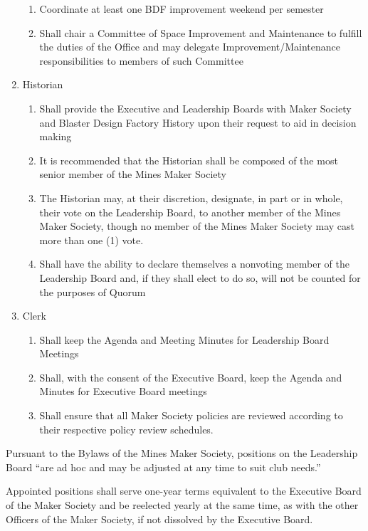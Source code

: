\documentclass[12pt,letterpaper]{article}
\begin{document}
\begin{enumerate}
\begin{enumerate}
        \item Coordinate at least one BDF improvement weekend per semester
        \item Shall chair a Committee of Space Improvement and Maintenance to fulfill the duties of the Office and may delegate Improvement/Maintenance responsibilities to members of such Committee
    \end{enumerate}
    \item Historian 
    \begin{enumerate}
        \item Shall provide the Executive and Leadership Boards with Maker Society and Blaster Design Factory History upon their request to aid in decision making
        \item It is recommended that the Historian shall be composed of the most senior member of the Mines Maker Society
        \item The Historian may, at their discretion, designate, in part or in whole, their vote on the Leadership Board, to another member of the Mines Maker Society, though no member of the Mines Maker Society may cast more than one (1) vote.
        \item Shall have the ability to declare themselves a nonvoting member of the Leadership Board and, if they shall elect to do so, will not be counted for the purposes of Quorum
    \end{enumerate}
    \item Clerk
    \begin{enumerate}
        \item Shall keep the Agenda and Meeting Minutes for Leadership Board Meetings
        \item Shall, with the consent of the Executive Board, keep the Agenda and Minutes for Executive Board meetings
        \item Shall ensure that all Maker Society policies are reviewed according to their respective policy review schedules.
    \end{enumerate}
\end{enumerate}


Pursuant to the Bylaws of the Mines Maker Society, positions on the Leadership Board “are ad hoc and may be adjusted at any time to suit club needs.” 

Appointed positions shall serve one-year terms equivalent to the Executive Board of the Maker Society and be reelected yearly at the same time, as with the other Officers of the Maker Society, if not dissolved by the Executive Board.
\end{document}
